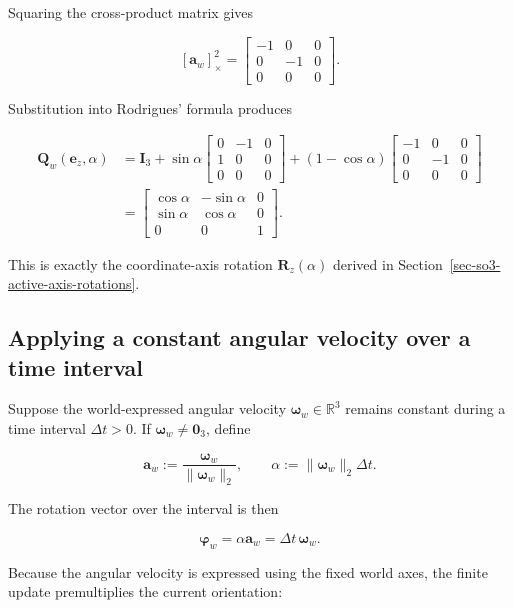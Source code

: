 \documentclass[
  australian,
  12pt,
  letterpaper,
  DIV=11,
  numbers=noendperiod,
  twoside]{scrreprt}
\begin{document}
Squaring the cross-product matrix gives

\[
[\mathbf a_w]_\times^2
=
\begin{bmatrix}
-1&0&0\\
0&-1&0\\
0&0&0
\end{bmatrix}.
\]

Substitution into Rodrigues' formula produces

\[
\begin{aligned}
\mathbf Q_w(\mathbf e_z,\alpha)
&=
\mathbf I_3
+
\sin\alpha
\begin{bmatrix}
0&-1&0\\
1&0&0\\
0&0&0
\end{bmatrix}
+
(1-\cos\alpha)
\begin{bmatrix}
-1&0&0\\
0&-1&0\\
0&0&0
\end{bmatrix}\\
&=
\boxed{
\begin{bmatrix}
\cos\alpha&-\sin\alpha&0\\
\sin\alpha&\cos\alpha&0\\
0&0&1
\end{bmatrix}
}.
\end{aligned}
\]

This is exactly the coordinate-axis rotation \(\mathbf R_z(\alpha)\)
derived in Section~\ref{sec-so3-active-axis-rotations}.

\subsection{Applying a constant angular velocity over a time
interval}\label{applying-a-constant-angular-velocity-over-a-time-interval}

Suppose the world-expressed angular velocity
\(\boldsymbol\omega_w\in\mathbb R^3\) remains constant during a time
interval \(\Delta t>0\). If \(\boldsymbol\omega_w\ne\mathbf 0_3\),
define

\[
\mathbf a_w
\mathrel{:=}
\frac{\boldsymbol\omega_w}{\|\boldsymbol\omega_w\|_2},
\qquad
\alpha
\mathrel{:=}
\|\boldsymbol\omega_w\|_2\Delta t.
\]

The rotation vector over the interval is then

\[
\boldsymbol\varphi_w
=
\alpha\mathbf a_w
=
\Delta t\,\boldsymbol\omega_w.
\]

Because the angular velocity is expressed using the fixed world axes,
the finite update premultiplies the current orientation:
\end{document}
